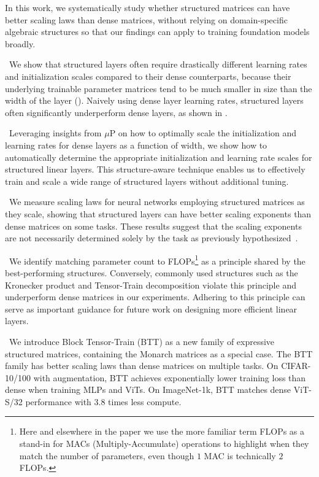 \documentclass{article}
\theoremstyle{plain}
\theoremstyle{definition}
\theoremstyle{remark}
\newcommand{\mup}{$\mu$P\xspace}
\begin{document}
In this work, we systematically study whether structured matrices can have better scaling laws than dense matrices, without relying on domain-specific algebraic structures so that our findings can apply to training foundation models broadly. 
%

\: \textbullet \, We show that structured layers often require drastically different learning rates and initialization scales compared to their dense counterparts, because their underlying trainable parameter matrices tend to be much smaller in size than the width of the layer (). Naively using dense layer learning rates, structured layers often significantly underperform dense layers, as shown in .

\: \textbullet \, Leveraging insights from \mup \citep{yang2023spectral} on how to optimally scale the initialization and learning rates for dense layers as a function of width, we show how to automatically determine the appropriate initialization and learning rate scales for structured linear layers. This structure-aware technique enables us to effectively train and scale a wide range of structured layers without additional tuning.

\: \textbullet \, We measure scaling laws for neural networks employing structured matrices as they scale, showing that structured layers can have better scaling exponents than dense matrices on some tasks. These results suggest that the scaling exponents are not necessarily determined solely by the task as previously hypothesized~\citep{bahri2021explaining,michaud2023quantization}.

\: \textbullet \, We identify matching parameter count to FLOPs\footnote{Here and elsewhere in the paper we use the more familiar term FLOPs as a stand-in for MACs (Multiply-Accumulate) operations to highlight when they match the number of parameters, even though $1$ MAC is technically $2$ FLOPs.} as a principle shared by the best-performing structures. Conversely, commonly used structures such as the Kronecker product and Tensor-Train decomposition violate this principle and underperform dense matrices in our experiments. Adhering to this principle can serve as important guidance for future work on designing more efficient linear layers.

\: \textbullet \, We introduce Block Tensor-Train (BTT) as a new family of expressive structured matrices, containing the Monarch matrices \citep{dao2022monarch} as a special case. The BTT family has better scaling laws than dense matrices on multiple tasks. On CIFAR-10/100 with augmentation, BTT achieves exponentially lower training loss than dense when training MLPs and ViTs. On ImageNet-1k, BTT matches dense ViT-S/32 performance with 3.8 times less compute. 
\end{document}
